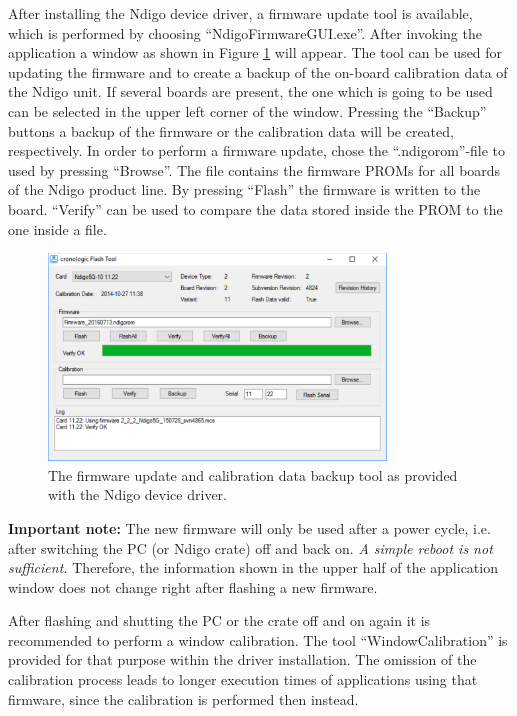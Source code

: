        After installing the Ndigo device driver, a firmware update tool is available, which is performed by choosing ``NdigoFirmwareGUI.exe''. After invoking the application a window as shown in Figure \ref{fig:Firmware} will appear. The tool can be used for updating the firmware and to create a backup of the on-board calibration data of the Ndigo unit. If several boards are present, the one which is going to be used can be selected in the upper left corner of the window. Pressing the ``Backup'' buttons a backup of the firmware or the calibration data will be created, respectively. In order to perform a firmware update, chose the ``.ndigorom''-file to used by pressing ``Browse''. The file contains the firmware PROMs for all boards of the Ndigo product line. By pressing ``Flash'' the firmware is written to the board. ``Verify'' can be used to compare the data stored inside the PROM to the one inside a file.\par

        \begin{figure}[ht]
            \begin{center}
                \includegraphics[width=0.8\textwidth]{figures/Firmware.pdf}
                \caption{\label{fig:Firmware}The firmware update and calibration data backup tool as provided with the Ndigo device driver.}
            \end{center}
        \end{figure}

\textbf{Important note:} The new firmware will only be used after a power cycle, i.e. after switching the PC (or Ndigo crate) off and back on. \emph{A simple reboot is not sufficient.} Therefore, the information shown in the upper half of the application window does not change right after flashing a new firmware.\par
After flashing and shutting the PC or the crate off and on again it is recommended to perform a window calibration. The tool ``WindowCalibration'' is provided for that purpose within the driver installation. The omission of the calibration process leads to longer execution times of applications using that firmware, since the calibration is performed then instead.

